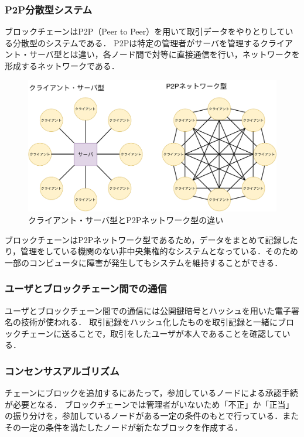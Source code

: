 \documentclass[a4j,12pt]{jsarticle}
\begin{document}
\subsubsection{P2P分散型システム}
ブロックチェーンはP2P（Peer to Peer）を用いて取引データをやりとりしている分散型のシステムである．
P2Pは特定の管理者がサーバを管理するクライアント・サーバ型とは違い，各ノード間で対等に直接通信を行い，ネットワークを形成するネットワークである．
\begin{figure}[H]
\centering
\includegraphics[width=13cm]{P2P.pdf}
\caption{クライアント・サーバ型とP2Pネットワーク型の違い}
\label{fig:no}
\end{figure} 



ブロックチェーンはP2Pネットワーク型であるため，データをまとめて記録したり，管理をしている機関のない非中央集権的なシステムとなっている．そのため一部のコンピュータに障害が発生してもシステムを維持することができる．

\subsubsection{ユーザとブロックチェーン間での通信}
ユーザとブロックチェーン間での通信には公開鍵暗号とハッシュを用いた電子署名の技術が使われる．
取引記録をハッシュ化したものを取引記録と一緒にブロックチェーンに送ることで，取引をしたユーザが本人であることを確認している．




\subsubsection{コンセンサスアルゴリズム}
チェーンにブロックを追加するにあたって，参加しているノードによる承認手続が必要となる．
ブロックチェーンでは管理者がいないため「不正」か「正当」の振り分けを，参加しているノードがある一定の条件のもとで行っている．またその一定の条件を満たしたノードが新たなブロックを作成する．
\end{document}

